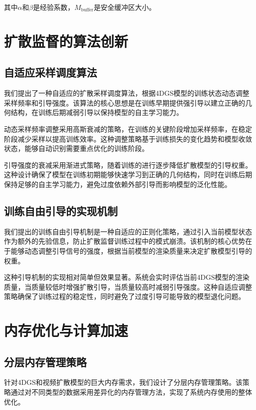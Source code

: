 其中$\alpha$和$\beta$是经验系数，$M_{\text{buffer}}$是安全缓冲区大小。

\section{扩散监督的算法创新}

\subsection{自适应采样调度算法}

我们提出了一种自适应的扩散采样调度算法，根据4DGS模型的训练状态动态调整采样频率和引导强度。该算法的核心思想是在训练早期提供强引导以建立正确的几何结构，在训练后期减弱引导以保持模型的自主学习能力。

动态采样频率调整采用高斯衰减的策略，在训练的关键阶段增加采样频率，在稳定阶段减少采样以提高训练效率。这种调整策略基于训练损失的变化趋势和模型收敛状态，能够自动识别需要重点优化的训练阶段。

引导强度的衰减采用渐进式策略，随着训练的进行逐步降低扩散模型的引导权重。这种设计确保了模型在训练初期能够快速学习到正确的几何结构，同时在训练后期保持足够的自主学习能力，避免过度依赖外部引导而影响模型的泛化性能。

\subsection{训练自由引导的实现机制}

我们提出的训练自由引导机制是一种自适应的正则化策略，通过引入当前模型状态作为额外的先验信息，防止扩散监督训练过程中的模式崩溃。该机制的核心优势在于能够动态调整引导信号的强度，根据当前模型的渲染质量来决定扩散模型引导的权重。

这种引导机制的实现相对简单但效果显著。系统会实时评估当前4DGS模型的渲染质量，当质量较低时增强扩散引导，当质量较高时减弱引导强度。这种自适应调整策略确保了训练过程的稳定性，同时避免了过度引导可能导致的模型退化问题。

\section{内存优化与计算加速}

\subsection{分层内存管理策略}

针对4DGS和视频扩散模型的巨大内存需求，我们设计了分层内存管理策略。该策略通过对不同类型的数据采用差异化的内存管理方法，实现了系统内存使用的整体优化。

